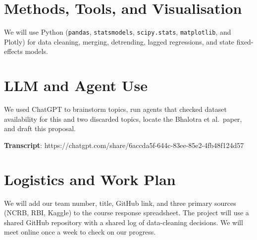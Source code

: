 \documentclass[12pt,a4paper]{article}
\begin{document}
\section{Methods, Tools, and Visualisation}

We will use Python (\texttt{pandas}, \texttt{statsmodels},
\texttt{scipy.stats}, \texttt{matplotlib}, and Plotly) for data
cleaning, merging, detrending, lagged regressions, and state
fixed-effects models.



\section{LLM and Agent Use}

We used ChatGPT to brainstorm topics, run agents
that checked dataset availability for this and two discarded topics,
locate the Bhalotra et al.\ paper, and draft this proposal. 

\textbf{Transcript}: https://chatgpt.com/share/6accda5f-644c-83ee-85e2-4fb48f124d57


\section{Logistics and Work Plan}

We will add our team number, title, GitHub link, and three primary
sources (NCRB, RBI, Kaggle) to the course response spreadsheet.
The project will use a shared GitHub repository with a shared log
of data-cleaning decisions. We will meet online once a week to check on our progress.


\end{document}
